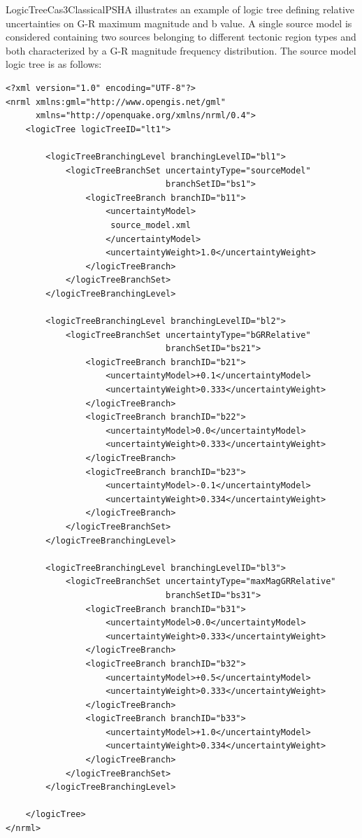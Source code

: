 LogicTreeCas3ClassicalPSHA illustrates an example of logic tree defining relative uncertainties on G-R maximum magnitude and b value.
A single source model is considered containing two sources belonging to different tectonic region types and both characterized by a G-R 
magnitude frequency distribution. The source model logic tree is as follows:
\begin{Verbatim}[frame=single, commandchars=\\\{\}, fontsize=\normalsize]
<?xml version="1.0" encoding="UTF-8"?>
<nrml xmlns:gml="http://www.opengis.net/gml"
      xmlns="http://openquake.org/xmlns/nrml/0.4">
    <logicTree logicTreeID="lt1">

        <logicTreeBranchingLevel branchingLevelID="bl1">
            <logicTreeBranchSet uncertaintyType="sourceModel"
                                branchSetID="bs1">
                <logicTreeBranch branchID="b11">
                    <uncertaintyModel>
                     source_model.xml
                    </uncertaintyModel>
                    <uncertaintyWeight>1.0</uncertaintyWeight>
                </logicTreeBranch>
            </logicTreeBranchSet>
        </logicTreeBranchingLevel>

        <logicTreeBranchingLevel branchingLevelID="bl2">
            <logicTreeBranchSet uncertaintyType="bGRRelative"
                                branchSetID="bs21">
                <logicTreeBranch branchID="b21">
                    <uncertaintyModel>+0.1</uncertaintyModel>
                    <uncertaintyWeight>0.333</uncertaintyWeight>
                </logicTreeBranch>
                <logicTreeBranch branchID="b22">
                    <uncertaintyModel>0.0</uncertaintyModel>
                    <uncertaintyWeight>0.333</uncertaintyWeight>
                </logicTreeBranch>
                <logicTreeBranch branchID="b23">
                    <uncertaintyModel>-0.1</uncertaintyModel>
                    <uncertaintyWeight>0.334</uncertaintyWeight>
                </logicTreeBranch>
            </logicTreeBranchSet>
        </logicTreeBranchingLevel>

        <logicTreeBranchingLevel branchingLevelID="bl3">
            <logicTreeBranchSet uncertaintyType="maxMagGRRelative"
                                branchSetID="bs31">
                <logicTreeBranch branchID="b31">
                    <uncertaintyModel>0.0</uncertaintyModel>
                    <uncertaintyWeight>0.333</uncertaintyWeight>
                </logicTreeBranch>
                <logicTreeBranch branchID="b32">
                    <uncertaintyModel>+0.5</uncertaintyModel>
                    <uncertaintyWeight>0.333</uncertaintyWeight>
                </logicTreeBranch>
                <logicTreeBranch branchID="b33">
                    <uncertaintyModel>+1.0</uncertaintyModel>
                    <uncertaintyWeight>0.334</uncertaintyWeight>
                </logicTreeBranch>
            </logicTreeBranchSet>
        </logicTreeBranchingLevel>

    </logicTree>
</nrml>
\end{Verbatim}
